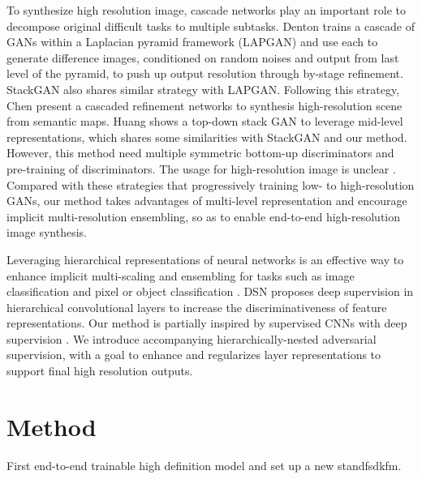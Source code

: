 \documentclass[10pt,twocolumn,letterpaper]{article}
\begin{document}
To synthesize high resolution image, cascade networks play an important role to decompose original difficult tasks to multiple subtasks.
Denton \etal \cite{denton2015deep} trains a cascade of GANs within a Laplacian pyramid framework (LAPGAN) and use each to generate difference images, conditioned on random noises and output from last level of the pyramid, to push up output resolution through by-stage refinement. StackGAN also shares similar strategy with LAPGAN. Following this strategy, Chen \etal \cite{chen2017photographic} present a cascaded refinement networks to synthesis high-resolution scene from semantic maps. 
Huang \etal \cite{huang2016stacked}
shows a top-down stack GAN to leverage mid-level representations, which shares some similarities with StackGAN and our method. However, this method need multiple symmetric  bottom-up discriminators and pre-training of discriminators. The usage for high-resolution image is unclear \cite{han2017stackgan}. Compared with these strategies that progressively training low- to high-resolution GANs, our method takes advantages of multi-level representation and encourage implicit multi-resolution ensembling, so as to enable end-to-end high-resolution image synthesis.


Leveraging hierarchical representations of neural networks is an effective way to enhance implicit multi-scaling and ensembling for tasks such as image classification \cite{lee2015deeply} and pixel or object classification \cite{xie2015holistically,cai2016unified,long2015fully}. DSN \cite{lee2015deeply} proposes deep supervision in hierarchical convolutional layers to increase the discriminativeness of feature representations. 
Our method is partially inspired by supervised CNNs with deep supervision \cite{lee2015deeply,xie2015holistically}. We introduce accompanying hierarchically-nested adversarial supervision, with a goal to enhance and regularizes layer representations to support final high resolution outputs.   

%
%
%

\section{Method}
First end-to-end trainable high definition model and set up a new standfsdkfm.
\end{document}

